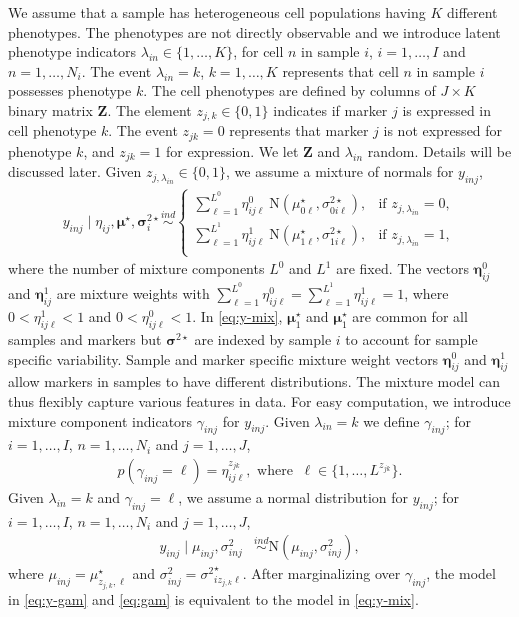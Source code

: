 \documentclass[12pt,]{article}
\newcommand{\N}{ \mathcal{N} }
\newcommand{\ind}{\overset{ind}{\sim}}
\def\bet{\bm{\eta}}
\def\N{\text{N}}
\def\Z{\bm{Z}}
\def\bmu{\bm{\mu}}
\def\bsig{\bm{\sigma}}
\begin{document}
We assume that a sample has heterogeneous cell populations having $K$ different
phenotypes.  The phenotypes are not directly observable and we introduce latent
phenotype indicators \(\lambda_{in} \in \{1, \ldots, K\}\), for cell $n$ in
sample $i$, \(i=1, \ldots, I\) and \(n=1, \ldots, N_i\).  The event
$\lambda_{in}=k$, $k=1, \ldots, K$ represents that cell $n$ in sample $i$
possesses phenotype $k$.  The cell phenotypes are defined by columns of \(J
\times K\) binary matrix \(\Z\). The element \(z_{j, k} \in \{0, 1\}\)
indicates if marker \(j\) is expressed in cell phenotype \(k\). The event
\(z_{jk}=0\) represents that marker \(j\) is not expressed for phenotype $k$,
and \(z_{jk}=1\) for expression. We let $\Z$ and $\lambda_{in}$ random. Details
will be discussed later.  Given \(z_{j, \lambda_{in}} \in \{0, 1\}\), we assume
a mixture of normals for \(y_{inj}\),
\begin{align}
y_{inj} \mid \eta_{ij}, \bmu^\star, \bsig^{2 \star}_{i} \ind
\begin{cases}
\sum_{\ell=1}^{L^0} \eta^0_{ij\ell}~ \N(\mu^\star_{0\ell}, \sigma^{2 \star}_{0i\ell}), &\mbox{if $z_{j,\lambda_{in}}=0$},\\
\sum_{\ell=1}^{L^1} \eta^1_{ij\ell}~ \N(\mu^\star_{1\ell}, \sigma^{2 \star}_{1i\ell}), &\mbox{if $z_{j,\lambda_{in}}=1$},\\
\end{cases} \label{eq:y-mix}
\end{align}
where the number of mixture components \(L^0\) and \(L^1\) are fixed.  The
vectors $\bet^0_{ij}$ and $\bet^1_{ij}$ are mixture weights with
\(\sum_{\ell=1}^{L^0} \eta^0_{ij\ell}=\sum_{\ell=1}^{L^1}\eta^1_{ij\ell}=1\),
where \(0 < \eta^1_{ij\ell} < 1\) and \(0 < \eta^0_{ij\ell} < 1\).  In
\eqref{eq:y-mix}, $\bmu^\star_1$ and $\bmu^\star_1$ are common for all samples
and markers but $\bsig^{2\star}$ are indexed by sample $i$ to account for
sample specific variability.  Sample and marker specific mixture weight vectors
$\bet^0_{ij}$ and $\bet^1_{ij}$ allow markers in samples to have different
distributions.   The mixture model can thus flexibly capture various features
in data.  For easy computation, we introduce mixture component indicators
$\gamma_{inj}$ for $y_{inj}$.  Given \(\lambda_{in}=k\) we define
\(\gamma_{inj}\); for \(i=1, \ldots, I\), \(n=1, \ldots, N_i\) and \(j=1,
\ldots, J\),
\begin{eqnarray}
p(\gamma_{inj} = \ell)=\eta^{z_{jk}}_{ij\ell}, \mbox{ where }~ \ell \in \{1,\ldots, L^{z_{jk}}\}. \label{eq:gam}
\end{eqnarray}
Given \(\lambda_{in}=k\) and \(\gamma_{inj}=\ell\), we assume a normal
distribution for \(y_{inj}\); for \(i=1, \ldots, I\),
\(n=1, \ldots, N_i\) and \(j=1, \ldots, J\),
\begin{align}
  y_{inj} \mid \mu_{inj}, \sigma^2_{inj}  &\ind \N(\mu_{inj}, \sigma^2_{inj}), \label{eq:y-gam}
\end{align}
where \(\mu_{inj} = \mu^\star_{z_{j,k},\ell}\) and \(\sigma^2_{inj} =
{\sigma^{2}}^\star_{iz_{j,k}\ell}\). After marginalizing over $\gamma_{inj}$,
the model in \eqref{eq:y-gam} and \eqref{eq:gam} is equivalent to the model in
\eqref{eq:y-mix}.  
\end{document}
